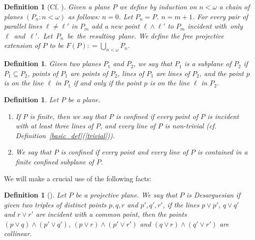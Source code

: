 \documentclass{amsart}
\newtheorem{definition}[theorem]{Definition}
\numberwithin{claimcounter}{theorem}
\begin{document}
	\begin{definition}[Cf. {\cite[Theorem 11.4]{piper}}]\label{def_free_ext} Given a plane $P$ we define by induction on $n < \omega$ a chain of planes $(P_n : n < \omega)$ as follows:
\newline $n = 0$. Let $P_n = P$.
\newline $n = m+1$. For every pair of parallel lines $\ell \neq \ell'$ in $P_m$ add a new point $\ell \wedge \ell'$ to $P_m$ incident \mbox{with only $\ell$ and $\ell'$. Let $P_n$ be the resulting plane.}
\newline We define the {\em free projective extension} of $P$ to be $F(P) : = \bigcup_{n < \omega} P_n$.
\end{definition}

	\begin{definition} Given two planes $P_1$ and $P_2$, we say that $P_1$ is a {\em subplane} of $P_2$ if $P_1 \subseteq P_2$, points of $P_1$ are points of $P_2$, lines of $P_1$ are lines of $P_2$, and the point $p$ is on the line $\ell$ in $P_1$ if and only if the point $p$ is on the line $\ell$ in $P_2$.
\end{definition}

	\begin{definition}\label{def_conf} Let $P$ be a plane.
	\begin{enumerate}[(1)]
	\item If $P$ is {\em finite}, then we say that $P$ is {\em confined} if every point of $P$ is incident with at least three lines of $P$, and every line of $P$ is non-trivial (cf. Definition~\ref{basic_def}(\ref{trivial})).
	\item We say that $P$ is confined if every point and every line of $P$ is contained in a finite confined subplane of $P$.
\end{enumerate}	
\end{definition}

	We will make a crucial use of the following facts:
	
	\begin{definition}[{\cite[Definition 5.1.1]{steven}}]\label{desarg_def} Let $P$ be a projective plane. We say that $P$ is {\em Desarguesian} if given two triples of distinct points $p, q, r$ and $p', q', r'$, if the lines $p\vee p'$, $q \vee q'$ and $r \vee r'$ are incident with a common point, then the points $(p \vee q) \wedge (p' \vee q')$, $(p \vee r) \wedge (p' \vee r')$ and $(q \vee r) \wedge (q' \vee r')$ are collinear.
\end{definition}
	
\end{document}
